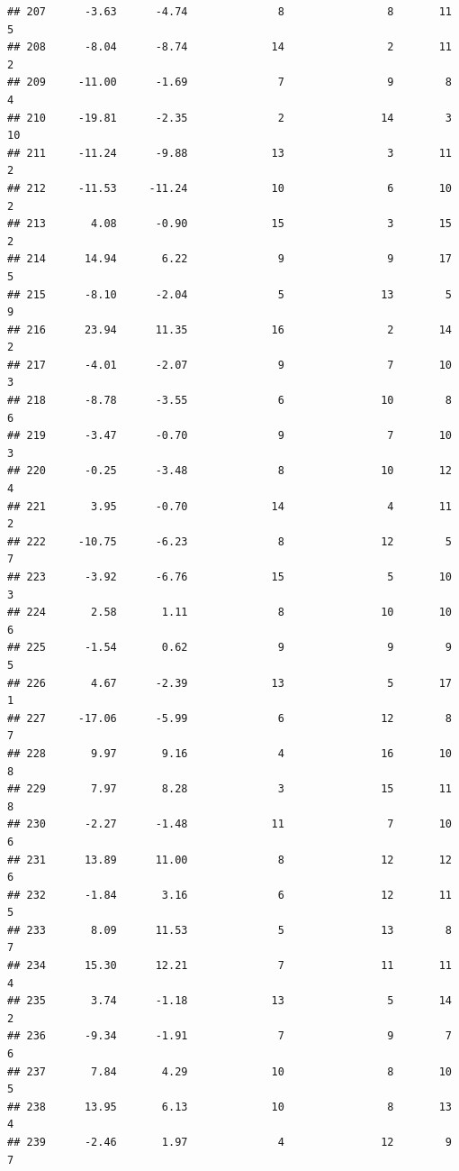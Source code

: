 \documentclass[]{book}
\begin{document}
\begin{verbatim}
## 207      -3.63      -4.74              8                8       11          5
## 208      -8.04      -8.74             14                2       11          2
## 209     -11.00      -1.69              7                9        8          4
## 210     -19.81      -2.35              2               14        3         10
## 211     -11.24      -9.88             13                3       11          2
## 212     -11.53     -11.24             10                6       10          2
## 213       4.08      -0.90             15                3       15          2
## 214      14.94       6.22              9                9       17          5
## 215      -8.10      -2.04              5               13        5          9
## 216      23.94      11.35             16                2       14          2
## 217      -4.01      -2.07              9                7       10          3
## 218      -8.78      -3.55              6               10        8          6
## 219      -3.47      -0.70              9                7       10          3
## 220      -0.25      -3.48              8               10       12          4
## 221       3.95      -0.70             14                4       11          2
## 222     -10.75      -6.23              8               12        5          7
## 223      -3.92      -6.76             15                5       10          3
## 224       2.58       1.11              8               10       10          6
## 225      -1.54       0.62              9                9        9          5
## 226       4.67      -2.39             13                5       17          1
## 227     -17.06      -5.99              6               12        8          7
## 228       9.97       9.16              4               16       10          8
## 229       7.97       8.28              3               15       11          8
## 230      -2.27      -1.48             11                7       10          6
## 231      13.89      11.00              8               12       12          6
## 232      -1.84       3.16              6               12       11          5
## 233       8.09      11.53              5               13        8          7
## 234      15.30      12.21              7               11       11          4
## 235       3.74      -1.18             13                5       14          2
## 236      -9.34      -1.91              7                9        7          6
## 237       7.84       4.29             10                8       10          5
## 238      13.95       6.13             10                8       13          4
## 239      -2.46       1.97              4               12        9          7

\end{verbatim}
\end{document}
